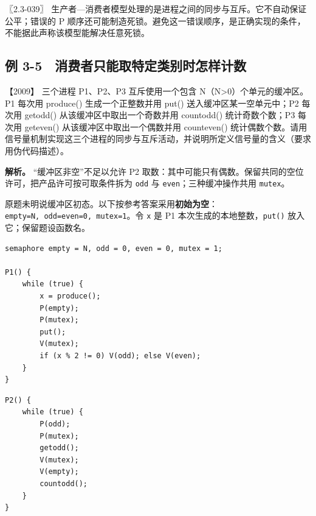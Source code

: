 \noindent{}〖2.3-039〗 生产者---消费者模型处理的是进程之间的同步与互斥。它不自动保证公平；错误的 P 顺序还可能制造死锁。避免这一错误顺序，是正确实现的条件，不能据此声称该模型能解决任意死锁。

\subsection{例 3-5　消费者只能取特定类别时怎样计数}\label{ex-2009}

\noindent{}【2009】 三个进程 P1、P2、P3 互斥使用一个包含 N（N\textgreater0）个单元的缓冲区。P1 每次用 produce() 生成一个正整数并用 put() 送入缓冲区某一空单元中；P2 每次用 getodd() 从该缓冲区中取出一个奇数并用 countodd() 统计奇数个数；P3 每次用 geteven() 从该缓冲区中取出一个偶数并用 counteven() 统计偶数个数。请用信号量机制实现这三个进程的同步与互斥活动，并说明所定义信号量的含义（要求用伪代码描述）。


\textbf{解析。} ``缓冲区非空''不足以允许 P2 取数：其中可能只有偶数。保留共同的空位许可，把产品许可按可取条件拆为 \allowbreak{}\texttt{odd} 与 \allowbreak{}\texttt{even}；三种缓冲操作共用 \allowbreak{}\texttt{mutex}。

原题未明说缓冲区初态。以下按参考答案采用\textbf{初始为空}：\allowbreak{}\texttt{empty=N,}\allowbreak{}\texttt{\ odd=even=0,}\allowbreak{}\texttt{\ mutex=1}。令 \allowbreak{}\texttt{x} 是 P1 本次生成的本地整数，\allowbreak{}\texttt{put()} 放入它；保留题设函数名。

\par\medskip\noindent
\begin{minipage}{\linewidth}
\begin{verbatim}
semaphore empty = N, odd = 0, even = 0, mutex = 1;

P1() {
    while (true) {
        x = produce();
        P(empty);
        P(mutex);
        put();
        V(mutex);
        if (x % 2 != 0) V(odd); else V(even);
    }
}
\end{verbatim}
\end{minipage}\par\medskip

\par\medskip\noindent
\begin{minipage}{\linewidth}
\begin{verbatim}
P2() {
    while (true) {
        P(odd);
        P(mutex);
        getodd();
        V(mutex);
        V(empty);
        countodd();
    }
}
\end{verbatim}
\end{minipage}\par\medskip

